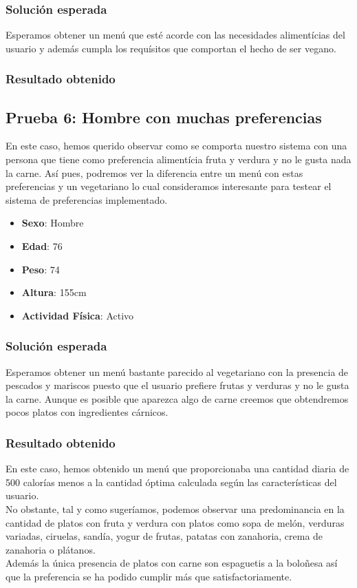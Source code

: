 \documentclass[11]{article}
\begin{document}
\subsubsection{Solución esperada}
Esperamos obtener un menú que esté acorde con las necesidades alimentícias del usuario y además cumpla los requísitos que comportan el hecho de ser vegano.

\subsubsection{Resultado obtenido}

\subsection{Prueba 6: Hombre con muchas preferencias}
En este caso, hemos querido observar como se comporta nuestro sistema con una persona que tiene como preferencia alimentícia fruta y verdura y no le gusta nada la carne. Así pues, podremos ver la diferencia entre un menú con estas preferencias y un vegetariano lo cual consideramos interesante para testear el sistema de preferencias implementado. 

\begin{itemize}
\item \textbf{Sexo}: Hombre
\item \textbf{Edad}: 76
\item \textbf{Peso}: 74
\item \textbf{Altura}: 155cm
\item \textbf{Actividad Física}: Activo
\end{itemize}
\subsubsection{Solución esperada}
Esperamos obtener un menú bastante parecido al vegetariano con la presencia de pescados y mariscos puesto que el usuario prefiere frutas y verduras y no le gusta la carne. Aunque es posible que aparezca algo de carne creemos que obtendremos pocos platos con ingredientes cárnicos. 

\subsubsection{Resultado obtenido}

En este caso, hemos obtenido un menú que proporcionaba una cantidad diaria de 500 calorías menos a la cantidad óptima calculada según las características del usuario. 
\\
No obstante, tal y como sugeríamos, podemos observar una predominancia en la cantidad de platos con fruta y verdura con platos como sopa de melón, verduras variadas, ciruelas, sandía, yogur de frutas, patatas con zanahoria, crema de zanahoria o plátanos. 
\\
Además la única presencia de platos con carne son espaguetis a la boloñesa así que la preferencia se ha podido cumplir más que satisfactoriamente. 
\end{document}
